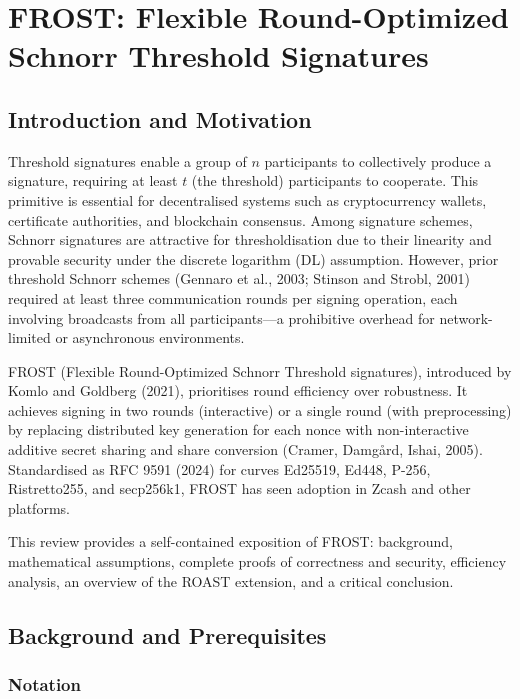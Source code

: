 \section{FROST: Flexible Round-Optimized Schnorr Threshold Signatures}
\label{sec:frost_review}

\subsection{Introduction and Motivation}

Threshold signatures enable a group of \(n\) participants to collectively produce a signature, requiring at least \(t\) (the threshold) participants to cooperate. This primitive is essential for decentralised systems such as cryptocurrency wallets, certificate authorities, and blockchain consensus. Among signature schemes, Schnorr signatures are attractive for thresholdisation due to their linearity and provable security under the discrete logarithm (DL) assumption. However, prior threshold Schnorr schemes (Gennaro et al., 2003; Stinson and Strobl, 2001) required at least three communication rounds per signing operation, each involving broadcasts from all participants—a prohibitive overhead for network-limited or asynchronous environments.

FROST (Flexible Round-Optimized Schnorr Threshold signatures), introduced by Komlo and Goldberg (2021), prioritises round efficiency over robustness. It achieves signing in two rounds (interactive) or a single round (with preprocessing) by replacing distributed key generation for each nonce with non-interactive additive secret sharing and share conversion (Cramer, Damgård, Ishai, 2005). Standardised as RFC 9591 (2024) for curves Ed25519, Ed448, P-256, Ristretto255, and secp256k1, FROST has seen adoption in Zcash and other platforms.

This review provides a self-contained exposition of FROST: background, mathematical assumptions, complete proofs of correctness and security, efficiency analysis, an overview of the ROAST extension, and a critical conclusion.

\subsection{Background and Prerequisites}

\subsubsection{Notation}

